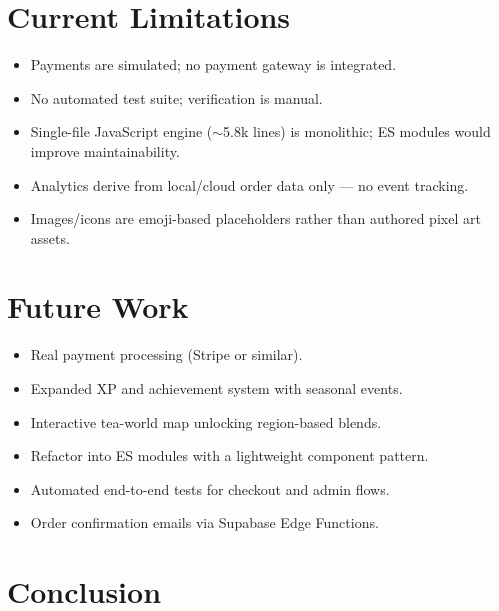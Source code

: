 \documentclass[11pt,a4paper]{article}
\begin{document}

\section{Current Limitations}

\begin{itemize}[nosep]
    \item Payments are simulated; no payment gateway is integrated.
    \item No automated test suite; verification is manual.
    \item Single-file JavaScript engine ($\sim$5.8k lines) is monolithic;
          ES modules would improve maintainability.
    \item Analytics derive from local/cloud order data only --- no event
          tracking.
    \item Images/icons are emoji-based placeholders rather than authored
          pixel art assets.
\end{itemize}


\section{Future Work}

\begin{itemize}[nosep]
    \item Real payment processing (Stripe or similar).
    \item Expanded XP and achievement system with seasonal events.
    \item Interactive tea-world map unlocking region-based blends.
    \item Refactor into ES modules with a lightweight component pattern.
    \item Automated end-to-end tests for checkout and admin flows.
    \item Order confirmation emails via Supabase Edge Functions.
\end{itemize}


\section{Conclusion}
\end{document}
